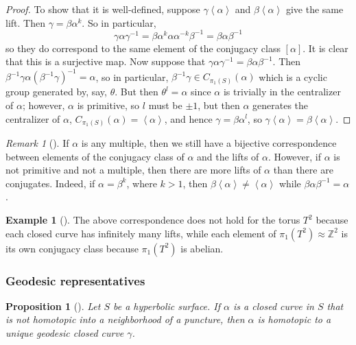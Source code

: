 \documentclass[reqno]{amsart}
\newtheorem{proposition}[theorem]{Proposition}
\theoremstyle{definition}
\newtheorem{example}[theorem]{Example}
\theoremstyle{remark}
\newtheorem*{remark}{Remark}
\begin{document}
 \begin{proof}
To show that it is well-defined, suppose $\gamma \left<\alpha \right>$ and
$\beta \left<\alpha \right>$ give the same lift. Then
$\gamma = \beta \alpha^k$. So in particular,
\[
    \gamma \alpha \gamma^{-1} = \beta \alpha^k \alpha \alpha^{-k} \beta^{-1}
    = \beta \alpha \beta^{-1}
\] 
so they do correspond to the same element of the conjugacy class
$\left[ \alpha \right] $. It is clear that this is a surjective map.
Now suppose that $\gamma \alpha \gamma^{-1} = \beta \alpha \beta^{-1}$. 
Then $\beta^{-1} \gamma \alpha \left( \beta^{-1} \gamma \right)^{-1} =
\alpha$, so in particular, $\beta^{-1} \gamma \in C_{\pi_1(S)}(\alpha)$
which is a cyclic group generated by, say, $\theta$. But then
$\theta^l = \alpha$ since $\alpha$ is trivially in the centralizer of
$\alpha$; however, $\alpha$ is primitive, so
$l$ must be $\pm 1$, but then  $\alpha$ generates the centralizer of
$\alpha$, $C_{\pi_1 (S)}(\alpha) = \left<\alpha \right>$, and hence
$\gamma = \beta \alpha^l$, so $\gamma \left<\alpha \right>
= \beta \left<\alpha \right>$.
 \end{proof}

 \begin{remark}[]
     If $\alpha$ is any multiple, then we still have a bijective correspondence
     between elements of the conjugacy class of $\alpha$ and the
     lifts of $\alpha$. However, if $\alpha$ is not primitive and not
     a multiple, then there are more lifts of $\alpha$ than there
     are conjugates. Indeed, if $\alpha = \beta^{k}$, where $k > 1$, then
     $\beta \left<\alpha \right> \neq \left<\alpha \right>$ while
     $\beta \alpha \beta^{-1} = \alpha$.
 \end{remark}

 \begin{example}[]
     The above correspondence does not hold for the torus $T^2$ because
     each closed curve has infinitely many lifts, while
     each element of $\pi_1 \left( T^2 \right) \approx \mathbb{Z}^2$ 
     is its own conjugacy class because $\pi_1 \left( T^2 \right) $ is
     abelian. 
 \end{example}

 \subsubsection{Geodesic representatives}
 \begin{proposition}[]\label{unique-geodesic-representative}
     Let $S$ be a hyperbolic surface. If $\alpha$ is a closed curve
     in $S$ that is not homotopic into a neighborhood of a puncture, then
     $\alpha$ is homotopic to a unique geodesic closed curve $\gamma$.
 \end{proposition}
 
\end{document}
